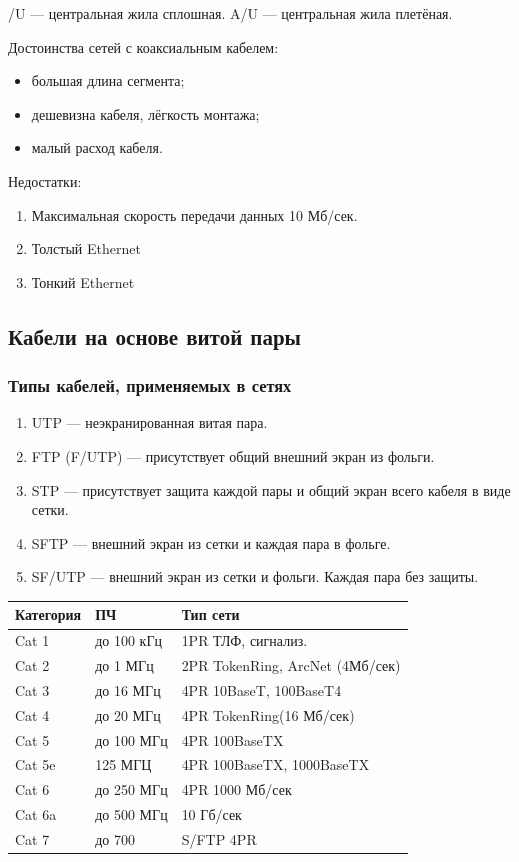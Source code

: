 \documentclass[12pt, russian, oneside, article]{ncc}
\begin{document}
/U --- центральная жила сплошная.
A/U --- центральная жила плетёная.

Достоинства сетей с коаксиальным кабелем:
\begin{itemize}
\item большая длина сегмента;
\item дешевизна кабеля, лёгкость монтажа;
\item малый расход кабеля.
\end{itemize}

Недостатки:
\begin{enumerate}
\item Максимальная скорость передачи данных 10 Мб/сек.
\item Толстый Ethernet
\item Тонкий Ethernet
\end{enumerate}
\subsection{Кабели на основе витой пары}
\label{sec-4_5}
\subsubsection{Типы кабелей, применяемых в сетях}
\label{sec-4_5_1}


\begin{enumerate}
\item UTP --- неэкранированная витая пара.
\item FTP (F/UTP) --- присутствует общий внешний экран из фольги.
\item STP --- присутствует защита каждой пары и общий экран всего кабеля в виде сетки.
\item SFTP --- внешний экран из сетки и каждая пара в фольге.
\item SF/UTP --- внешний экран из сетки и фольги. Каждая пара без защиты.
\end{enumerate}


\begin{center}
\begin{tabular}{lll}
 Категория  &  ПЧ          &  Тип сети                         \\
\hline
 Cat 1      &  до 100 кГц  &  1PR ТЛФ, сигнализ.               \\
 Cat 2      &  до 1 МГц    &  2PR TokenRing, ArcNet (4Мб/сек)  \\
 Cat 3      &  до 16 МГц   &  4PR 10BaseT, 100BaseT4           \\
 Cat 4      &  до 20 МГц   &  4PR TokenRing(16 Мб/сек)         \\
 Cat 5      &  до 100 МГц  &  4PR 100BaseTX                    \\
\hline
 Cat 5e     &  125 МГЦ     &  4PR 100BaseTX, 1000BaseTX        \\
 Cat 6      &  до 250 МГц  &  4PR 1000 Мб/сек                  \\
 Cat 6a     &  до 500 МГц  &  10 Гб/сек                        \\
 Cat 7      &  до 700      &  S/FTP 4PR                        \\
\end{tabular}
\end{center}
\end{document}
